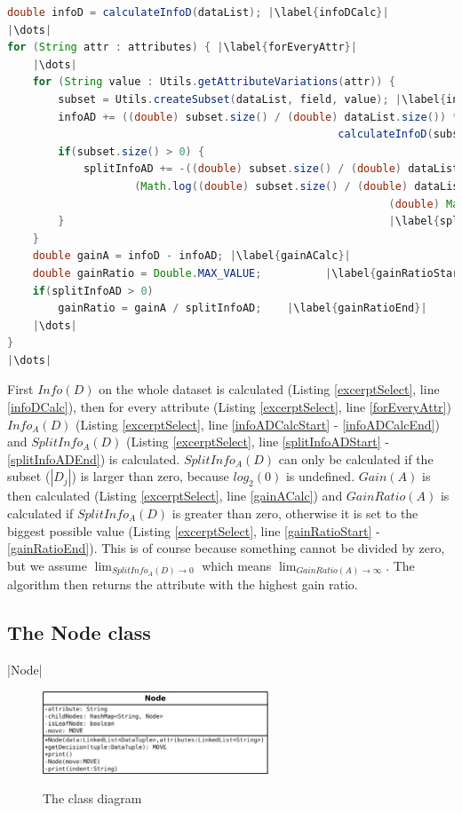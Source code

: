 \documentclass{article}
\begin{document}
    \begin{lstlisting}[language=Java, caption=Excerpt from \protect\UseVerb{term}, label={excerptSelect}, escapechar=|]
double infoD = calculateInfoD(dataList); |\label{infoDCalc}|
|\dots|
for (String attr : attributes) { |\label{forEveryAttr}|
    |\dots|
    for (String value : Utils.getAttributeVariations(attr)) {
        subset = Utils.createSubset(dataList, field, value); |\label{infoADCalcStart}|
        infoAD += ((double) subset.size() / (double) dataList.size()) *
                                                    calculateInfoD(subset); |\label{infoADCalcEnd}|
        if(subset.size() > 0) {                                             |\label{splitInfoADStart}|
            splitInfoAD += -((double) subset.size() / (double) dataList.size()) *
                    (Math.log((double) subset.size() / (double) dataList.size()) /
                                                            (double) Math.log(2));
        }                                                   |\label{splitInfoADEnd}|
    }
    double gainA = infoD - infoAD; |\label{gainACalc}|
    double gainRatio = Double.MAX_VALUE;          |\label{gainRatioStart}|
    if(splitInfoAD > 0)
        gainRatio = gainA / splitInfoAD;    |\label{gainRatioEnd}|
    |\dots|
}
|\dots|\end{lstlisting}
    First $Info(D)$ on the whole dataset is calculated (Listing \ref{excerptSelect}, line \ref{infoDCalc}), then for every attribute (Listing \ref{excerptSelect}, line \ref{forEveryAttr}) $Info_A (D)$ (Listing \ref{excerptSelect}, line \ref{infoADCalcStart} - \ref{infoADCalcEnd}) and $SplitInfo_A (D)$ (Listing \ref{excerptSelect}, line \ref{splitInfoADStart} - \ref{splitInfoADEnd}) is calculated. $SplitInfo_A (D)$ can only be calculated if the subset ($|D_j|$) is larger than zero, because $log_2 (0)$ is undefined.
    $Gain(A)$ is then calculated (Listing \ref{excerptSelect}, line \ref{gainACalc}) and $GainRatio(A)$ is calculated if $SplitInfo_A (D)$ is greater than zero, otherwise it is set to the biggest possible value  (Listing \ref{excerptSelect}, line \ref{gainRatioStart} - \ref{gainRatioEnd}). This is of course because something cannot be divided by zero, but we assume \(\lim_{SplitInfo_A (D) \to 0}\) which means  \(\lim_{GainRatio(A) \to \infty}\).
    The algorithm then returns the attribute with the highest gain ratio.

    \subsection{The Node class}
    |Node|
    \begin{figure}
        \caption{The \protect{} class diagram}
        \includegraphics[width=0.6\textwidth]{DiagramNode}
        \label{nodeClassDiag}
    \end{figure}
\end{document}
